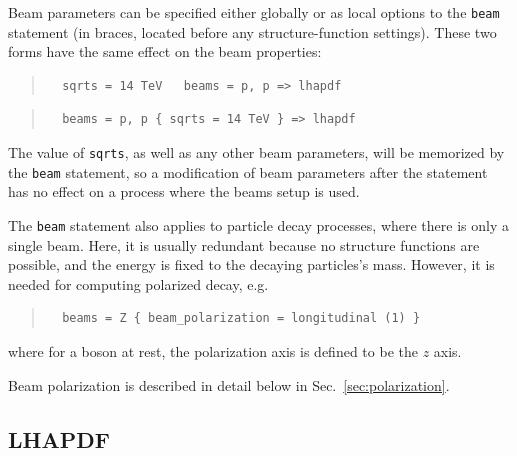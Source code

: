 \documentclass[12pt]{book}
\newcommand{\ttt}[1]{\texttt{#1}}
\begin{document}
Beam parameters can be specified either globally or as local options to the
\ttt{beam} statement (in braces, located before any structure-function
settings).  These two forms have the same effect on the beam properties:
\begin{quote}
\begin{footnotesize}
\begin{verbatim}
  sqrts = 14 TeV   beams = p, p => lhapdf
\end{verbatim}
\end{footnotesize}
\end{quote}
\begin{quote}
\begin{footnotesize}
\begin{verbatim}
  beams = p, p { sqrts = 14 TeV } => lhapdf
\end{verbatim}
\end{footnotesize}
\end{quote}
The value of \ttt{sqrts}, as well as any other beam parameters, will be
memorized by the \ttt{beam} statement, so a modification of beam parameters
after the statement has no effect on a process where the beams setup is used.

The \ttt{beam} statement also applies to particle decay processes, where there
is only a single beam.  Here, it is usually redundant because no structure
functions are possible, and the energy is fixed to the decaying particles's
mass.  However, it is needed for computing polarized decay, e.g.
\begin{quote}
\begin{footnotesize}
\begin{verbatim}
  beams = Z { beam_polarization = longitudinal (1) }
\end{verbatim}
\end{footnotesize}
\end{quote}
where for a boson at rest, the polarization axis is defined to be the $z$
axis.

Beam polarization is described in detail below in Sec.~\ref{sec:polarization}.


\subsection{LHAPDF}
\end{document}

